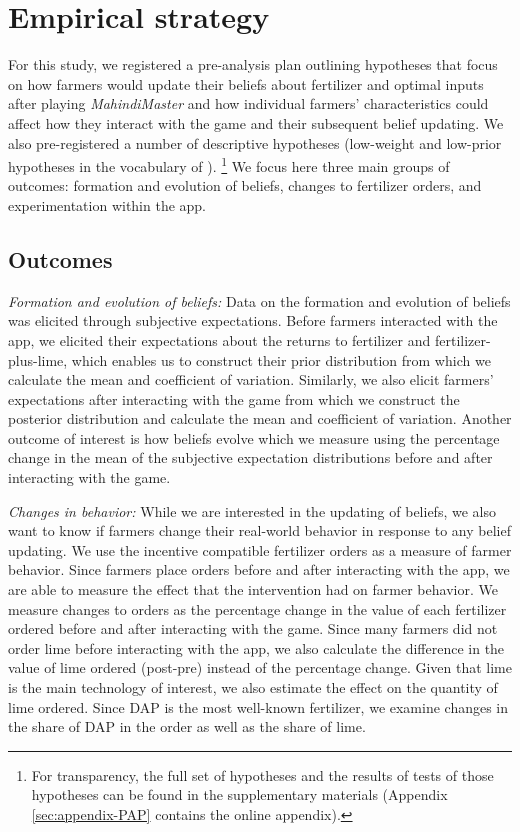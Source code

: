 \documentclass[12pt,letterpaper]{article}
\begin{document}
\section{Empirical strategy}\label{sec:empirical_strategy}
 
For this study, we registered a pre-analysis plan outlining hypotheses that focus on how farmers would update their beliefs about fertilizer and optimal inputs after playing \textit{MahindiMaster} and how individual farmers' characteristics could affect how they interact with the game and their subsequent belief updating. We also pre-registered a number of descriptive hypotheses (low-weight and low-prior hypotheses in the vocabulary of \cite{anderson_split-sample_2017}). \footnote{For transparency, the full set of hypotheses and the results of tests of those hypotheses can be found in the supplementary materials (Appendix \ref{sec:appendix-PAP} contains the online appendix).} We focus here three main groups of outcomes: formation and evolution of beliefs, changes to fertilizer orders, and experimentation within the app. 
 
\subsection{Outcomes}
 
\textit{Formation and evolution of beliefs:} Data on the formation and evolution of beliefs was elicited through subjective expectations. Before farmers interacted with the app, we elicited their expectations about the returns to fertilizer and fertilizer-plus-lime, which enables us to construct their prior distribution from which we calculate the mean and coefficient of variation. Similarly, we also elicit farmers' expectations after interacting with the game from which we construct the posterior distribution and calculate the mean and coefficient of variation. Another outcome of interest is how beliefs evolve which we measure using the percentage change in the mean of the subjective expectation distributions before and after interacting with the game. 
 
\textit{Changes in behavior:} While we are interested in the updating of beliefs, we also want to know if farmers change their real-world behavior in response to any belief updating. We use the incentive compatible fertilizer orders as a measure of farmer behavior. Since farmers place orders before and after interacting with the app, we are able to measure the effect that the intervention had on farmer behavior. We measure changes to orders as the percentage change in the value of each fertilizer ordered before and after interacting with the game. Since many farmers did not order lime before interacting with the app, we also calculate the difference in the value of lime ordered (post-pre) instead of the percentage change. Given that lime is the main technology of interest, we also estimate the effect on the quantity of lime ordered. Since DAP is the most well-known fertilizer, we examine changes in the share of DAP in the order as well as the share of lime. 
 
\end{document}
